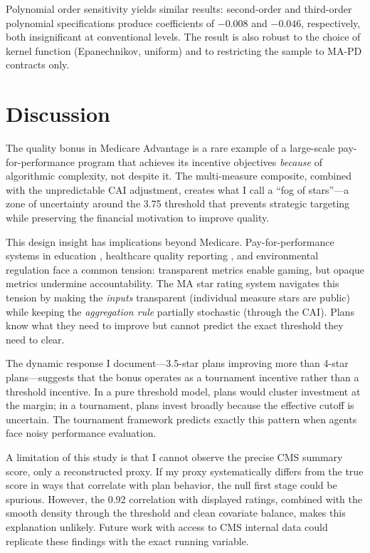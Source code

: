 \documentclass[12pt]{article}
\begin{document}


Polynomial order sensitivity yields similar results: second-order and third-order polynomial specifications produce coefficients of $-0.008$ and $-0.046$, respectively, both insignificant at conventional levels. The result is also robust to the choice of kernel function (Epanechnikov, uniform) and to restricting the sample to MA-PD contracts only.


\section{Discussion}
\label{sec:discussion}

The quality bonus in Medicare Advantage is a rare example of a large-scale pay-for-performance program that achieves its incentive objectives \emph{because} of algorithmic complexity, not despite it. The multi-measure composite, combined with the unpredictable CAI adjustment, creates what I call a ``fog of stars''---a zone of uncertainty around the 3.75 threshold that prevents strategic targeting while preserving the financial motivation to improve quality.

This design insight has implications beyond Medicare. Pay-for-performance systems in education \citep{neal2010}, healthcare quality reporting \citep{kolstad2013}, and environmental regulation face a common tension: transparent metrics enable gaming, but opaque metrics undermine accountability. The MA star rating system navigates this tension by making the \emph{inputs} transparent (individual measure stars are public) while keeping the \emph{aggregation rule} partially stochastic (through the CAI). Plans know what they need to improve but cannot predict the exact threshold they need to clear.

The dynamic response I document---3.5-star plans improving more than 4-star plans---suggests that the bonus operates as a tournament incentive rather than a threshold incentive. In a pure threshold model, plans would cluster investment at the margin; in a tournament, plans invest broadly because the effective cutoff is uncertain. The \citet{lazear1981} tournament framework predicts exactly this pattern when agents face noisy performance evaluation.

A limitation of this study is that I cannot observe the precise CMS summary score, only a reconstructed proxy. If my proxy systematically differs from the true score in ways that correlate with plan behavior, the null first stage could be spurious. However, the 0.92 correlation with displayed ratings, combined with the smooth density through the threshold and clean covariate balance, makes this explanation unlikely. Future work with access to CMS internal data could replicate these findings with the exact running variable.
\end{document}
